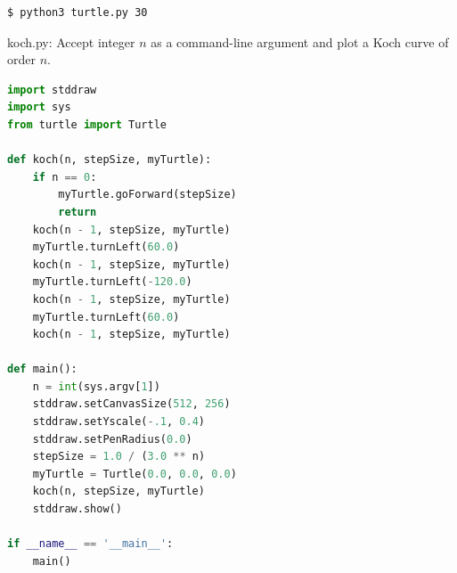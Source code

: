 \documentclass[8pt,a4paper,compress]{beamer}
\begin{document}
\begin{frame}[fragile]
\begin{minipage}{200pt}
\begin{lstlisting}[language={},style=focusin]
$ python3 turtle.py 30
\end{lstlisting}
\end{minipage}%
\hfill
\begin{minipage}{100pt}
\begin{center}
\end{center}
\end{minipage}%
\end{frame}

\begin{frame}[fragile]
\pause

\begin{framed}
\tiny koch.py: Accept integer $n$ as a command-line argument and plot a Koch curve of order $n$.
\end{framed}

\begin{lstlisting}[language=python,style=focusin]
import stddraw
import sys
from turtle import Turtle

def koch(n, stepSize, myTurtle):
    if n == 0:
        myTurtle.goForward(stepSize)
        return  
    koch(n - 1, stepSize, myTurtle)
    myTurtle.turnLeft(60.0)
    koch(n - 1, stepSize, myTurtle)
    myTurtle.turnLeft(-120.0)
    koch(n - 1, stepSize, myTurtle)
    myTurtle.turnLeft(60.0)
    koch(n - 1, stepSize, myTurtle)
 
def main():
    n = int(sys.argv[1])
    stddraw.setCanvasSize(512, 256)
    stddraw.setYscale(-.1, 0.4)
    stddraw.setPenRadius(0.0)
    stepSize = 1.0 / (3.0 ** n)
    myTurtle = Turtle(0.0, 0.0, 0.0)
    koch(n, stepSize, myTurtle)
    stddraw.show()

if __name__ == '__main__':
    main()
\end{lstlisting}
\end{frame}
\end{document}
